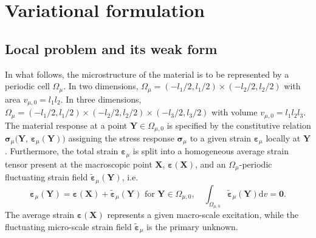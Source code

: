 \chapter{Variational formulation}


\section{Local problem and its weak form}

In what follows, the microstructure of the material is to be represented by a periodic cell \(\Omega_\mu\). In two dimensions, \(\Omega_\mu=\left(-l_{1} / 2, l_{1} / 2\right) \times\left(-l_{2} / 2, l_{2} / 2\right)\) with area \(v_{\mu,0}=l_{1} l_{2}\).
In three dimensions, \(\Omega_\mu=\left(-l_{1} / 2, l_{1} / 2\right) \times\left(-l_{2} / 2, l_{2} / 2\right)\times\left(-l_{3} / 2, l_{3} / 2\right)\) with volume \(v_{\mu,0}=l_{1} l_{2} l_{3}\).
The material response at a point \(\bm Y \in \Omega_{\mu,0}\) is specified by the constitutive relation \(\bm{\sigma}_\mu(\bm{Y}\), \(\bm\varepsilon_\mu(\bm{Y}))\) assigning the stress response \(\bm{\sigma}_\mu\) to a given strain \(\bm\varepsilon_\mu\) locally at \(\bm Y\).
Furthermore, the total strain \(\bm \varepsilon_\mu\) is split into a homogeneous average strain tensor present at the macroscopic point \(\bm X\), \(\bm \varepsilon(\bm X)\), and an \(\Omega_\mu\)-periodic fluctuating strain field \(\tilde{\bm \varepsilon}_\mu(\bm Y)\), i.e.
\begin{equation}
\bm\varepsilon_\mu(\bm{Y})=\bm \varepsilon(\bm X)+\tilde{\bm \varepsilon}_\mu(\bm{Y}) \text { for } \bm Y \in \Omega_{\mu,0}, \quad \int_{\Omega_{\mu,0} } \tilde{\bm\varepsilon}_\mu(\bm{Y}) \mathrm{d} v=\bm{0}.
\end{equation}
The average strain \(\bm \varepsilon(\bm X)\) represents a given macro-scale excitation, while the fluctuating micro-scale strain field \(\tilde{\bm\varepsilon}_\mu\) is the primary unknown.

